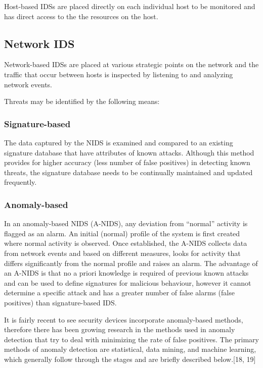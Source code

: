 \documentclass[12pt,]{article}
\begin{document}
Host-based IDSs are placed directly on each individual host to be
monitored and has direct access to the the resources on the host.

\subsection{Network IDS}\label{network-ids}

Network-based IDSs are placed at various strategic points on the network
and the traffic that occur between hosts is inspected by listening to
and analyzing network events.

Threats may be identified by the following means:

\subsubsection{Signature-based}\label{signature-based}

The data captured by the NIDS is examined and compared to an existing
signature database that have attributes of known attacks. Although this
method provides for higher accuracy (less number of false positives) in
detecting known threats, the signature database needs to be continually
maintained and updated frequently.

\subsubsection{Anomaly-based}\label{anomaly-based}

In an anomaly-based NIDS (A-NIDS), any deviation from ``normal''
activity is flagged as an alarm. An initial (normal) profile of the
system is first created where normal activity is observed. Once
established, the A-NIDS collects data from network events and based on
different measures, looks for activity that differs significantly from
the normal profile and raises an alarm. The advantage of an A-NIDS is
that no a priori knowledge is required of previous known attacks and can
be used to define signatures for malicious behaviour, however it cannot
determine a specific attack and has a greater number of false alarms
(false positives) than signature-based IDS.

It is fairly recent to see security devices incorporate anomaly-based
methods, therefore there has been growing research in the methods used
in anomaly detection that try to deal with minimizing the rate of false
positives. The primary methods of anomaly detection are statistical,
data mining, and machine learning, which generally follow through the
stages and are briefly described below.{[}18, 19{]}
\end{document}
